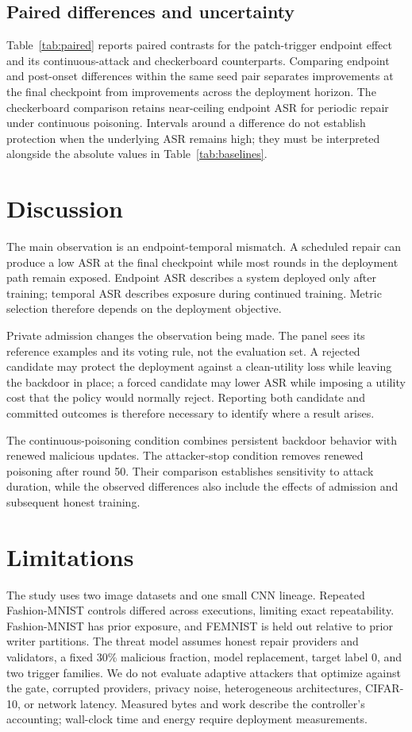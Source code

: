 \documentclass[sigconf,review,anonymous]{acmart}
\begin{document}
\subsection{Paired differences and uncertainty}
Table~\ref{tab:paired} reports paired contrasts for the patch-trigger endpoint effect and its continuous-attack and checkerboard counterparts. Comparing endpoint and post-onset differences within the same seed pair separates improvements at the final checkpoint from improvements across the deployment horizon. The checkerboard comparison retains near-ceiling endpoint ASR for periodic repair under continuous poisoning. Intervals around a difference do not establish protection when the underlying ASR remains high; they must be interpreted alongside the absolute values in Table~\ref{tab:baselines}.


\section{Discussion}
The main observation is an endpoint-temporal mismatch. A scheduled repair can produce a low ASR at the final checkpoint while most rounds in the deployment path remain exposed. Endpoint ASR describes a system deployed only after training; temporal ASR describes exposure during continued training. Metric selection therefore depends on the deployment objective.

Private admission changes the observation being made. The panel sees its reference examples and its voting rule, not the evaluation set. A rejected candidate may protect the deployment against a clean-utility loss while leaving the backdoor in place; a forced candidate may lower ASR while imposing a utility cost that the policy would normally reject. Reporting both candidate and committed outcomes is therefore necessary to identify where a result arises.

The continuous-poisoning condition combines persistent backdoor behavior with renewed malicious updates. The attacker-stop condition removes renewed poisoning after round 50. Their comparison establishes sensitivity to attack duration, while the observed differences also include the effects of admission and subsequent honest training.

\section{Limitations}
The study uses two image datasets and one small CNN lineage. Repeated Fashion-MNIST controls differed across executions, limiting exact repeatability. Fashion-MNIST has prior exposure, and FEMNIST is held out relative to prior writer partitions. The threat model assumes honest repair providers and validators, a fixed 30\% malicious fraction, model replacement, target label 0, and two trigger families. We do not evaluate adaptive attackers that optimize against the gate, corrupted providers, privacy noise, heterogeneous architectures, CIFAR-10, or network latency. Measured bytes and work describe the controller's accounting; wall-clock time and energy require deployment measurements.
\end{document}
